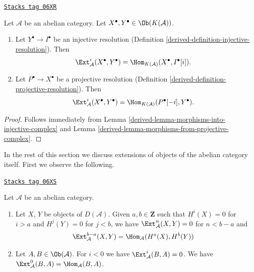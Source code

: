 \begin{lemma}
\label{derived-lemma-compute-ext-resolutions}
\href{https://stacks.math.columbia.edu/tag/06XR}{\texttt{Stacks tag 06XR}}

Let $\mathcal{A}$ be an abelian category.
Let $X^\bullet, Y^\bullet \in \Ob(K(\mathcal{A}))$.
\begin{enumerate}
\item Let $Y^\bullet \to I^\bullet$ be an injective resolution
(Definition \ref{derived-definition-injective-resolution}). Then
$$
\Ext^i_\mathcal{A}(X^\bullet, Y^\bullet) =
\Hom_{K(\mathcal{A})}(X^\bullet, I^\bullet[i]).
$$
\item Let $P^\bullet \to X^\bullet$ be a projective resolution
(Definition \ref{derived-definition-projective-resolution}). Then
$$
\Ext^i_\mathcal{A}(X^\bullet, Y^\bullet) =
\Hom_{K(\mathcal{A})}(P^\bullet[-i], Y^\bullet).
$$
\end{enumerate}
\end{lemma}

\begin{proof}

Follows immediately from
Lemma \ref{derived-lemma-morphisms-into-injective-complex}
and
Lemma \ref{derived-lemma-morphisms-from-projective-complex}.
\end{proof}

In the rest of this section we discuss extensions of objects of the
abelian category itself. First we observe the following.

\begin{lemma}
\label{derived-lemma-negative-exts}
\href{https://stacks.math.columbia.edu/tag/06XS}{\texttt{Stacks tag 06XS}}

Let $\mathcal{A}$ be an abelian category.
\begin{enumerate}
\item Let $X$, $Y$ be objects of $D(\mathcal{A})$. Given $a, b \in \mathbf{Z}$
such that $H^i(X) = 0$ for $i > a$ and $H^j(Y) = 0$
for $j < b$, we have $\Ext^n_\mathcal{A}(X, Y) = 0$ for
$n < b - a$ and
$$
\Ext^{b - a}_\mathcal{A}(X, Y) = \Hom_\mathcal{A}(H^a(X), H^b(Y))
$$
\item Let $A, B \in \Ob(\mathcal{A})$.
For $i < 0$ we have $\Ext^i_\mathcal{A}(B, A) = 0$.
We have $\Ext^0_\mathcal{A}(B, A) = \Hom_\mathcal{A}(B, A)$.
\end{enumerate}
\end{lemma}

